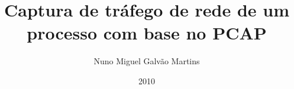 \documentclass[pt,prepmsc,twoside,12pt]{thesisdifctunl}
\title{Captura de tráfego de rede de um processo com base no PCAP}
\author{Nuno Miguel Galvão Martins}
\date{2010}
\begin{document}
\frontmatter

\frontpage

\presentationpage

\printdedicatory

\printacknowledgements

\printabstract

\tableofcontents 

\printotherlists 

\printchapters

\printbibliography

\printappendixes 

\end{document}

